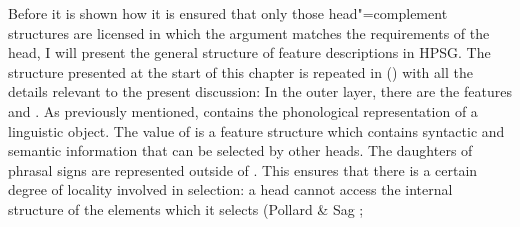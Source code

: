 Before it is shown how it is ensured that only those head"=complement structures are licensed in which the argument matches the requirements of the head, I will
present the general structure of feature descriptions in HPSG. The structure presented at the start of this chapter is repeated in () with all the details
relevant to the present discussion:
\ea
\label{LE-Grammatik}
\z
In the outer layer, there are the features \phon and \synsem. As previously mentioned, \phon contains the phonological representation of a linguistic
object. The value of \synsem is a feature structure which contains syntactic and semantic information that can be selected by other heads.
The daughters of phrasal signs are represented outside of \synsem. This ensures that there is a
certain degree of locality involved in selection: a head cannot access the internal
structure of the elements which it selects (Pollard \& Sag \citeyear[--145]{ps};
